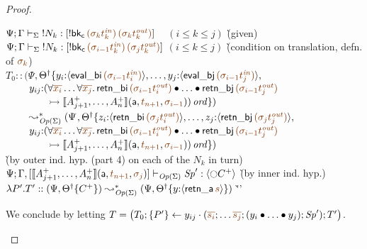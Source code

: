 \begin{proof}
\begin{itemize}
  \begin{tabbing}
  $\slst{\Sigma}{\Psi}{\Gamma}{\tbangr{N_k}}{[{!}{{\sf bk_c}\,\lf{({\sigma_k}t_k^{\it in})}\,\lf{({\sigma_k}t_k^{\it out})}}]}$ ~ $(i \leq k \leq j)$
  \` (given) 
  \\
  $\slst{\Sigma}{\Psi}{\Gamma}{\tbangr{N_k}}{[{!}{{\sf bk_c}\,\lf{({\sigma_{i-1}}t_k^{\it in})}\,\lf{({\sigma_j}t_k^{\it out})}}]}$ $(i \leq k \leq j)$
  \` (condition on translation, defn. of $\lf{\sigma_k}$)
  \\
  $T_0 :: (\Psi$\=$, \opsubst{\Theta} \tackonstart
        y_i{:}\susp{{\sf eval\_bi}\,\lf{({\sigma_{i-1}}t^{\it in}_i)}}, \ldots,
    y_j{:}\susp{{\sf eval\_bj}\,\lf{({\sigma_{i-1}}t^{\it in}_j)}},$\\
  \>$~ \qquad y_{ij}{:}(\forall\lf{\overline{x_i}}\ldots\forall\lf{\overline{x_j}}.\, 
     {\sf retn\_bi}\,\lf{(\sigma_{i-1}{t^{\it out}_i})}
     \fuse \ldots \fuse 
     {\sf retn\_bj}\,\lf{(\sigma_{i-1}{t^{\it out}_j})}$\\
  \>$~ \qquad\qquad
      \lefti \opbasic{A^+_{j+1},\ldots,A^+_n}{t_{n+1}}{\sigma_{i-1}})\,\mtrue
       \tackonstop)$\\
  $~ \qquad \leadsto^*_{{\it Op}({\Sigma})} 
        (\Psi$\=$, \opsubst{\Theta} \tackonstart
        z_i{:}\susp{{\sf retn\_bi}\,\lf{({\sigma_{j}}t^{\it out}_i)}}, \ldots,
    z_j{:}\susp{{\sf retn\_bj}\,\lf{({\sigma_{j}}t^{\it out}_j)}},$\\
  \>$~ \qquad y_{ij}{:}(\forall\lf{\overline{x_i}}\ldots\forall\lf{\overline{x_j}}.\, 
     {\sf retn\_bi}\,\lf{(\sigma_{i-1}{t^{\it out}_i})}
     \fuse \ldots \fuse 
     {\sf retn\_bj}\,\lf{(\sigma_{i-1}{t^{\it out}_j})}$\\
  \>$~ \qquad\qquad
      \lefti \opbasic{A^+_{j+1},\ldots,A^+_n}{t_{n+1}}{\sigma_{i-1}})\,\mtrue
       \tackonstop)$\\
  \` (by outer ind. hyp. (part 4) on each of the $N_k$ in turn)
  \\
  $\slst{\transop{\Sigma}}{\Psi}
     {\Gamma,[\opbasic{A^+_{j+1},\ldots,A^+_n}{t_{n+1}}{\sigma_{j}}]}
     {\Sp'}{\susp{{\ocircle}C^+}}$  
  \` (by inner ind. hyp.)
  \\
  $\lambda P'.T' :: (\Psi, \tackon{\opsubst{\Theta}}{C^+}) 
       \leadsto^*_{\transop{\Sigma}}
        (\Psi, \tackon{\opsubst{\Theta}}{y{:}\susp{{\sf retn\_a}\,\lf{s}}})$ 
 \` ''\qquad\qquad~
  \end{tabbing}
  We  conclude  by letting $T = 
  \left(T_0; \tstep{P'}{y_{ij}}{(\lf{\overline{s_i}}; \ldots \lf{\overline{s_j}}; (\tfuser{y_i}{\tfuser{\ldots}{y_j}}); \Sp')}; T'\right)$.


\end{itemize}
\end{proof}
